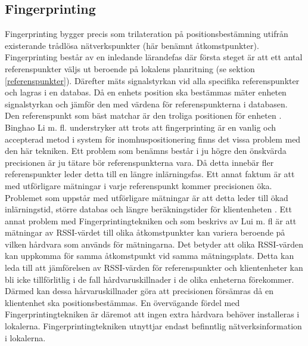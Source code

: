 \documentclass[swedish, a4paper,12pt]{article}
\begin{document}
\subsection{Fingerprinting}\label{fingerprinting}
Fingerprinting bygger precis som trilateration på positionsbestämning utifrån existerande trådlösa nätverkspunkter (här benämnt åtkomstpunkter). Fingerprinting består av en inledande lärandefas där första steget är att ett antal referenspunkter väljs ut beroende på lokalens planritning (se sektion \ref{referenspunkter}). Därefter mäts signalstyrkan vid alla specifika referenspunkter och lagras i en databas. %
Då en enhets position ska bestämmas mäter enheten signalstyrkan och jämför den med värdena för referenspunkterna i databasen. Den referenspunkt som bäst matchar är den troliga positionen för enheten \cite{IP1}\cite{jun2018low}.
Binghao Li m. fl. understryker att trots att fingerprinting är en vanlig och accepterad metod i system för inomhuspositionering finns det vissa problem med den här tekniken\cite{IP1}.
Ett problem som benämns består i ju högre den önskvärda precisionen är ju tätare bör referenspunkterna vara. Då detta innebär fler referenspunkter leder detta till en längre inlärningsfas. Ett annat faktum är att med utförligare mätningar i varje referenspunkt kommer precisionen öka. Problemet som uppstår med utförligare mätningar är att detta leder till ökad inlärningstid, större databas och längre beräkningstider för klientenheten \cite{IP1}. Ett annat problem med Fingerprintingtekniken och som beskrivs av Lui m. fl \cite{problem_with_RSSI} är att mätningar av RSSI-värdet till olika åtkomstpunkter kan variera beroende på vilken hårdvara som används för mätningarna. Det betyder att olika RSSI-värden kan uppkomma för samma åtkomstpunkt vid samma mätningsplats. Detta kan leda till att jämförelsen av RSSI-värden för referenspunkter och klientenheter kan bli icke tillförlitlig i de fall hårdvaruskillnader i de olika enheterna förekommer. Därmed kan dessa hårvaruskillnader göra att precisionen försämras då en klientenhet ska positionsbestämmas\cite{problem_with_RSSI}. En övervägande fördel med Fingerprintingtekniken är däremot att ingen extra hårdvara behöver installeras i lokalerna. Fingerprintingtekniken utnyttjar endast befinntlig nätverksinformation i lokalerna.
\end{document}
